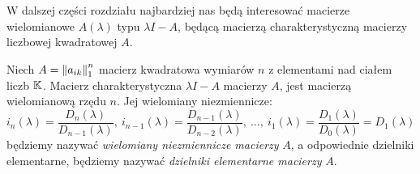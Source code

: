 W dalszej części rozdziału najbardziej nas będą interesować macierze wielomianowe $A(\lambda)$ typu $\lambda I - A$, będącą macierzą charakterystyczną macierzy liczbowej kwadratowej $A$.

\begin{definition}
Niech $A = \left\| a_{ik} \right\|_{1}^{n}$ macierz kwadratowa wymiarów $n$ z elementami nad ciałem liczb $\mathbb{K}$. Macierz charakterystyczna $\lambda I - A$ macierzy $A$, jest macierzą wielomianową rzędu $n$. Jej wielomiany niezmiennicze:
$$ i_{n}(\lambda) = \frac{D_{n}(\lambda)}{D_{n-1}(\lambda)}, \ i_{n-1}(\lambda) = \frac{D_{n-1}(\lambda)}{D_{n-2}(\lambda)}, \
\ldots, \ i_{1}(\lambda) = \frac{D_{1}(\lambda)}{D_{0}(\lambda)} = D_{1}(\lambda) $$
będziemy nazywać \textit{wielomiany niezmiennicze macierzy} $A$, a odpowiednie dzielniki elementarne, będziemy nazywać
\textit{dzielniki elementarne macierzy} $A$. 
\end{definition}


